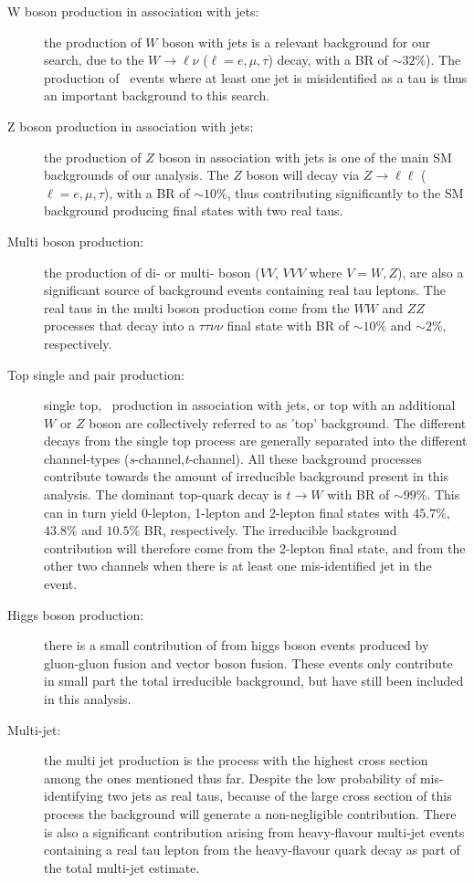 	\begin{description}
	\item[W boson production in association with jets:] the production of $W$ boson with jets is a relevant background for our search, due to the $W\rightarrow\ell\nu$ ($\ell=e,\mu,\tau$) decay, with a \ac{BR} of $\sim32\%$). The production of \Wjets\ events where at least one jet is misidentified as a tau is thus an important background to this search.
	\item[Z boson production in association with jets:] the production of $Z$ boson in association with jets is one of the main \ac{SM} backgrounds of our analysis. The $Z$ boson will decay via $Z\rightarrow\ell\ell$ ($\ell=e,\mu,\tau$), with a \ac{BR} of $\sim10\%$, thus contributing significantly to the \ac{SM} background producing final states with two real taus.
	\item[Multi boson production:] the production of di- or multi- boson ($VV$, $VVV$ where $V=W,Z$), are also a significant source of background events containing real tau leptons. The real taus in the multi boson production come from the $WW$ and $ZZ$ processes that decay into a $\tau\tau\nu\nu$ final state with \ac{BR} of $\sim10\%$ and $\sim2\%$, respectively.~\cite{PDG}
	\item[Top single and pair production:] single top, \ttbar\ production in association with jets, or top with an additional $W$ or $Z$ boson are collectively referred to as 'top' background.  The different decays from the single top process are generally separated into the different channel-types (\textit{s}-channel,\textit{t}-channel). All these background processes contribute towards the amount of irreducible background present in this analysis. The dominant top-quark decay is $t\rightarrow W$ with \ac{BR} of $\sim99\%$. This can in turn yield 0-lepton, 1-lepton and 2-lepton final states with $45.7\%$, $43.8\%$ and $10.5\%$ \ac{BR}, respectively. The irreducible background contribution will therefore come from the 2-lepton final state, and from the other two channels when there is at least one mis-identified jet in the event.
	\item[Higgs boson production:] there is a small contribution of from higgs boson events produced by gluon-gluon fusion and vector boson fusion. These events only contribute in small part the total irreducible background, but have still been included in this analysis. 
	\item[Multi-jet:] the multi jet production is the process with the highest cross section among the ones mentioned thus far. Despite the low probability of mis-identifying two jets as real taus, because of the large cross section of this process the background will generate a non-negligible contribution. There is also a significant contribution arising from heavy-flavour multi-jet events containing a real tau lepton from the heavy-flavour quark decay as part of the total multi-jet estimate.
	\end{description}
	
